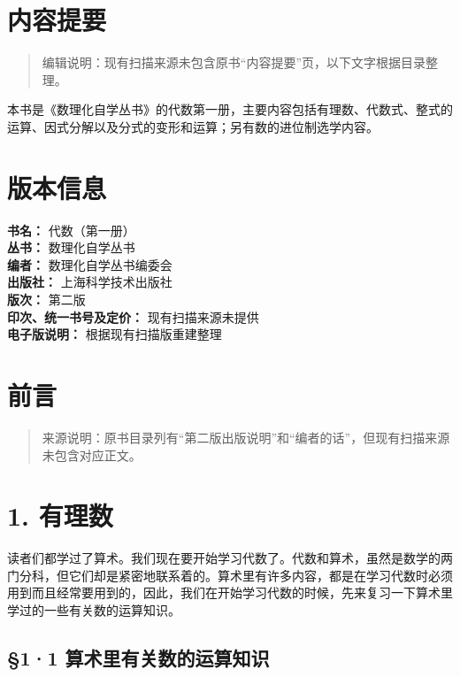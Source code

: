 \chapter*{内容提要}

\begin{quote}
编辑说明：现有扫描来源未包含原书``内容提要''页，以下文字根据目录整理。
\end{quote}

本书是《数理化自学丛书》的代数第一册，主要内容包括有理数、代数式、整式的运算、因式分解以及分式的变形和运算；另有数的进位制选学内容。

\chapter*{版本信息}

\begin{flushleft}
\textbf{书名：} 代数（第一册）\\
\textbf{丛书：} 数理化自学丛书\\
\textbf{编者：} 数理化自学丛书编委会\\
\textbf{出版社：} 上海科学技术出版社\\
\textbf{版次：} 第二版\\
\textbf{印次、统一书号及定价：} 现有扫描来源未提供\\
\textbf{电子版说明：} 根据现有扫描版重建整理
\end{flushleft}

\chapter{前言}

\begin{quote}
来源说明：原书目录列有``第二版出版说明''和``编者的话''，但现有扫描来源未包含对应正文。
\end{quote}

\chapter{1. 有理数}

读者们都学过了算术。我们现在要开始学习代数了。代数和算术，虽然是数学的两门分科，但它们却是紧密地联系着的。算术里有许多内容，都是在学习代数时必须用到而且经常要用到的，因此，我们在开始学习代数的时候，先来复习一下算术里学过的一些有关数的运算知识。

\section{§1·1 算术里有关数的运算知识}

